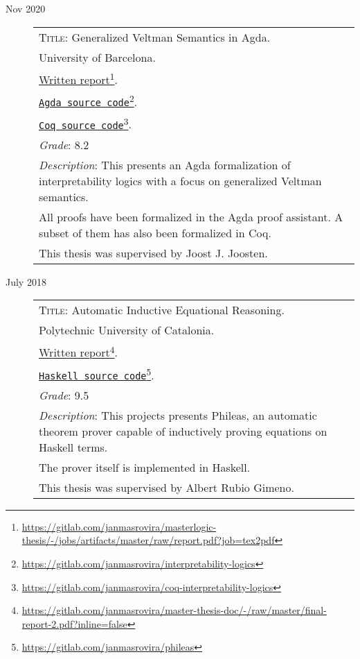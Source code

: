 \documentclass[11pt]{article}
\newcommand{\fnlink}[2]{\href{#1}{#2}\footnote{\url{#1}}}
\begin{document}
\begin{description}
\item[Nov 2020]
\begin{minipage}{\textwidth}

  \begin{tabular}{|p{12cm}}

    \textsc{Title}: Generalized Veltman Semantics in Agda. \\
    University of Barcelona. \\
    \fnlink{https://gitlab.com/janmasrovira/masterlogic-thesis/-/jobs/artifacts/master/raw/report.pdf?job=tex2pdf}{Written report}. \\
    \fnlink{https://gitlab.com/janmasrovira/interpretability-logics}{\texttt{Agda source code}}. \\
    \fnlink{https://gitlab.com/janmasrovira/coq-interpretability-logics}{\texttt{Coq source code}}. \\
    \textit{Grade}: 8.2 \\
    \textit{Description}: This presents an Agda formalization of interpretability logics with a focus on generalized Veltman semantics.
    \\All proofs have been formalized in the Agda proof assistant. A subset of them has also been formalized in Coq.
    \\This thesis was supervised by Joost J. Joosten.

  \end{tabular}
\end{minipage}

\item[July 2018]
  \begin{minipage}{\textwidth}
    \begin{tabular}{|p{12cm}}
      \textsc{Title}: Automatic Inductive Equational Reasoning. \\
      Polytechnic University of Catalonia. \\
      \fnlink{https://gitlab.com/janmasrovira/master-thesis-doc/-/raw/master/final-report-2.pdf?inline=false}{Written report}. \\
      \fnlink{https://gitlab.com/janmasrovira/phileas}{\texttt{Haskell source code}}. \\
      \textit{Grade}: 9.5 \\
      \textit{Description}: This projects presents Phileas, an automatic
      theorem prover capable of inductively proving equations on Haskell
      terms.
      \\The prover itself is implemented in Haskell.
      \\This thesis was supervised by Albert Rubio Gimeno.

    \end{tabular}
  \end{minipage}

\end{description}
\end{document}
